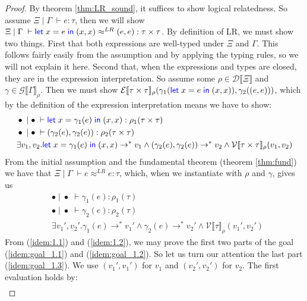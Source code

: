 \documentclass[a4paper, 11pt]{report}
\theoremstyle{definition}
\newcommand{\var}{x}
\newcommand{\expr}{e}
\newcommand{\val}{v}
\newcommand{\Tprod}[2]{#1 \times #2}
\newcommand{\typ}{\tau}
\newcommand{\venv}{\Gamma}
\newcommand{\tenv}{\Xi}
\newcommand{\emptenv}{\bullet}
\newcommand{\empvenv}{\bullet}
\newcommand{\jdg}[4]{#1 \; | \; #2 \; \vdash #3 : #4}
\newcommand{\jdgRel}[6]{#1 \; | \; #2 \; \vdash #3 \approx^{#4} #5 : #6}
\newcommand{\stepS}{\rightarrow^*}
\newcommand{\ValInp}[2]{\mathcal{V} \llbracket #1 \rrbracket_{#2}}
\newcommand{\ValInpGen}[2]{\ValInp{#1}{#2}(\val_1, \val_2)}
\newcommand{\ExpInp}[2]{\mathcal{E} \llbracket #1 \rrbracket_{#2}}
\newcommand{\VenvInp}[2]{\mathcal{G} \llbracket #1 \rrbracket_{#2}}
\newcommand{\TenvInp}[1]{\mathcal{D} \llbracket #1 \rrbracket}
\newcommand{\LogRel}[5]{\jdgRel{#1}{#2}{#3}{LR}{#4}{#5}}
\begin{document}
\begin{proof}
  By theorem \ref{thm:LR_sound}, it suffices to show logical relatedness. So assume $\jdg{\tenv}{\venv}{\expr}{\typ}$, then we will show $\LogRel{\tenv}{\venv}{\Let \var = \expr in (\var, \var)}{(\expr, \expr)}{\Tprod{\typ}{\typ}}$. By definition of LR, we must show two things. First that both expressions are well-typed under $\tenv$ and $\venv$. This follows fairly easily from the assumption and by applying the typing rules, so we will not explain it here. Second that, when the expressions and types are closed, they are in the expression interpretation. So assume some $\rho \in \TenvInp{\tenv}$ and $\gamma \in \VenvInp{\venv}{\rho}$. Then we must show $\ExpInp{\Tprod{\typ}{\typ}}{\rho}(\gamma_1(\Let \var = \expr in (\var, \var)), \gamma_2((\expr, \expr)))$, which by the definition of the expression interpretation means we have to show:
  \begin{align}
    &\jdg{\emptenv}{\empvenv}{\Let \var = \gamma_1(\expr) in (\var, \var)}{\rho_1(\Tprod{\typ}{\typ})}\label{idem:goal_1.1}\\
    &\jdg{\emptenv}{\empvenv}{(\gamma_2(\expr), \gamma_2(\expr))}{\rho_2(\Tprod{\typ}{\typ})}\label{idem:goal_1.2}\\
    &\exists \val_1, \val_2 . \Let \var = \gamma_1(\expr) in (\var, \var) \stepS \val_1 \land (\gamma_2(\expr), \gamma_2(\expr)) \stepS \val_2 \land\ValInpGen{\Tprod{\typ}{\typ}}{\rho}\label{idem:goal_1.3}
  \end{align}
  From the initial assumption and the fundamental theorem (theorem \ref{thm:fund}) we have that $\LogRel{\tenv}{\venv}{\expr}{\expr}{\typ}$, which, when we instantiate with $\rho$ and $\gamma$, gives us 
  \begin{align}
    &\jdg{\emptenv}{\empvenv}{\gamma_1(\expr)}{\rho_1(\typ)}\label{idem:1.1}\\
    &\jdg{\emptenv}{\empvenv}{\gamma_2(\expr)}{\rho_2(\typ)}\label{idem:1.2}\\
    &\exists \val_1', \val_2' . \gamma_1(\expr) \stepS \val_1' \land \gamma_2(\expr) \stepS \val_2' \land\ValInp{\typ}{\rho}(\val_1', \val_2')\label{idem:1.3}
  \end{align}
  From (\ref*{idem:1.1}) and (\ref*{idem:1.2}), we may prove the first two parts of the goal (\ref*{idem:goal_1.1}) and (\ref*{idem:goal_1.2}). So let us turn our attention the last part (\ref*{idem:goal_1.3}). We use $(\val_1', \val_1')$ for $\val_1$ and $(\val_2', \val_2')$ for $\val_2$. The first evaluation holds by:
  \begin{multline}

\end{multline}
\end{proof}
\end{document}
